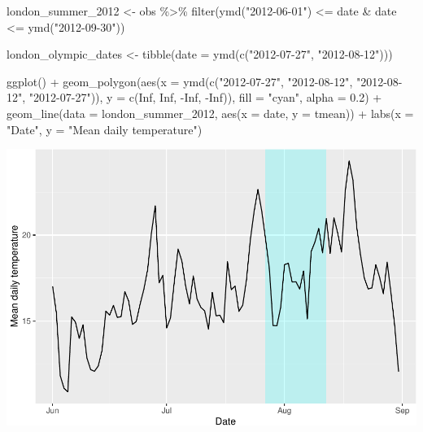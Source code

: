 \documentclass[
]{book}
\newenvironment{Shaded}{\begin{snugshade}}{\end{snugshade}}
\newcommand{\AttributeTok}[1]{\textcolor[rgb]{0.77,0.63,0.00}{#1}}
\newcommand{\ConstantTok}[1]{\textcolor[rgb]{0.00,0.00,0.00}{#1}}
\newcommand{\FloatTok}[1]{\textcolor[rgb]{0.00,0.00,0.81}{#1}}
\newcommand{\FunctionTok}[1]{\textcolor[rgb]{0.00,0.00,0.00}{#1}}
\newcommand{\NormalTok}[1]{#1}
\newcommand{\OtherTok}[1]{\textcolor[rgb]{0.56,0.35,0.01}{#1}}
\newcommand{\SpecialCharTok}[1]{\textcolor[rgb]{0.00,0.00,0.00}{#1}}
\newcommand{\StringTok}[1]{\textcolor[rgb]{0.31,0.60,0.02}{#1}}
\begin{document}
\begin{Shaded}
\begin{Highlighting}[]
\NormalTok{london\_summer\_2012 }\OtherTok{\textless{}{-}}\NormalTok{ obs }\SpecialCharTok{\%\textgreater{}\%} 
  \FunctionTok{filter}\NormalTok{(}\FunctionTok{ymd}\NormalTok{(}\StringTok{"2012{-}06{-}01"}\NormalTok{) }\SpecialCharTok{\textless{}=}\NormalTok{ date }\SpecialCharTok{\&}\NormalTok{ date }\SpecialCharTok{\textless{}=} \FunctionTok{ymd}\NormalTok{(}\StringTok{"2012{-}09{-}30"}\NormalTok{))}

\NormalTok{london\_olympic\_dates }\OtherTok{\textless{}{-}} \FunctionTok{tibble}\NormalTok{(}\AttributeTok{date =} \FunctionTok{ymd}\NormalTok{(}\FunctionTok{c}\NormalTok{(}\StringTok{"2012{-}07{-}27"}\NormalTok{, }\StringTok{"2012{-}08{-}12"}\NormalTok{)))}

\FunctionTok{ggplot}\NormalTok{() }\SpecialCharTok{+} 
  \FunctionTok{geom\_polygon}\NormalTok{(}\FunctionTok{aes}\NormalTok{(}\AttributeTok{x =} \FunctionTok{ymd}\NormalTok{(}\FunctionTok{c}\NormalTok{(}\StringTok{"2012{-}07{-}27"}\NormalTok{, }\StringTok{"2012{-}08{-}12"}\NormalTok{, }
                             \StringTok{"2012{-}08{-}12"}\NormalTok{, }\StringTok{"2012{-}07{-}27"}\NormalTok{)), }
                   \AttributeTok{y =} \FunctionTok{c}\NormalTok{(}\ConstantTok{Inf}\NormalTok{, }\ConstantTok{Inf}\NormalTok{, }\SpecialCharTok{{-}}\ConstantTok{Inf}\NormalTok{, }\SpecialCharTok{{-}}\ConstantTok{Inf}\NormalTok{)), }\AttributeTok{fill =} \StringTok{"cyan"}\NormalTok{, }\AttributeTok{alpha =} \FloatTok{0.2}\NormalTok{) }\SpecialCharTok{+} 
  \FunctionTok{geom\_line}\NormalTok{(}\AttributeTok{data =}\NormalTok{ london\_summer\_2012, }\FunctionTok{aes}\NormalTok{(}\AttributeTok{x =}\NormalTok{ date, }\AttributeTok{y =}\NormalTok{ tmean)) }\SpecialCharTok{+} 
  \FunctionTok{labs}\NormalTok{(}\AttributeTok{x =} \StringTok{"Date"}\NormalTok{, }\AttributeTok{y =} \StringTok{"Mean daily temperature"}\NormalTok{)}
\end{Highlighting}
\end{Shaded}

\includegraphics{adv_epi_analysis_files/figure-latex/unnamed-chunk-62-1.pdf}
\end{document}
